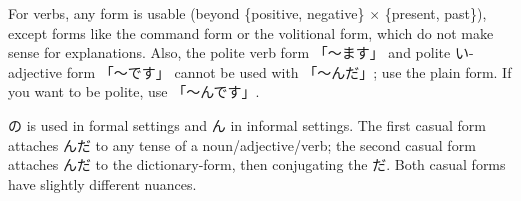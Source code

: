 \documentclass[../nihongo-gakushuu-kyouzai.tex]{subfiles}
\begin{document}

For verbs, any form is usable (beyond \{positive, negative\} $\times$ \{present, past\}), except forms like the command form or the volitional form, which do not make sense for explanations. Also, the polite verb form 「〜ます」 and polite い-adjective form 「〜です」 cannot be used with 「〜んだ」; use the plain form. If you want to be polite, use 「〜んです」.

の is used in formal settings and ん in informal settings. The first casual form attaches んだ to any tense of a noun/adjective/verb; the second casual form attaches んだ to the dictionary-form, then conjugating the だ. Both casual forms have slightly different nuances.
\end{document}
